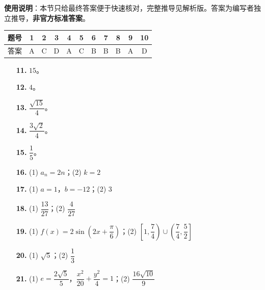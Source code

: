 
\begin{gknotice}
\textbf{使用说明}：本节只给最终答案便于快速核对，完整推导见解析版。答案为编写者独立推导，\textbf{非官方标准答案}。
\end{gknotice}

\begin{center}\begin{tabular}{ccccccccccc}
\toprule
题号 & 1 & 2 & 3 & 4 & 5 & 6 & 7 & 8 & 9 & 10 \\
\midrule
答案 & A & C & D & A & C & B & B & B & A & D \\
\bottomrule
\end{tabular}\end{center}

\begin{itemize}[leftmargin=2.6em]
  \item[\textbf{11.}] $15$。
  \item[\textbf{12.}] $4$。
  \item[\textbf{13.}] $\dfrac{\sqrt{15}}4$。
  \item[\textbf{14.}] $\dfrac{3\sqrt2}4$。
  \item[\textbf{15.}] $\dfrac15$。
\end{itemize}

\begin{itemize}[leftmargin=2.6em]
  \item[\textbf{16.}] (1) $a_n=2n$；(2) $k=2$
  \item[\textbf{17.}] (1) $a=1$，$b=-12$；(2) $3$
  \item[\textbf{18.}] (1) $\dfrac{13}{27}$；(2) $\dfrac4{27}$
  \item[\textbf{19.}] (1) $f(x)=2\sin\left(2x+\dfrac\pi6\right)$；(2) $\left[1,\dfrac74\right)\cup\left(\dfrac74,\dfrac52\right]$
  \item[\textbf{20.}] (1) $\sqrt5$；(2) $\dfrac13$
  \item[\textbf{21.}] (1) $e=\dfrac{2\sqrt5}5$，$\dfrac{x^2}{20}+\dfrac{y^2}4=1$；(2) $\dfrac{16\sqrt{10}}9$
\end{itemize}
